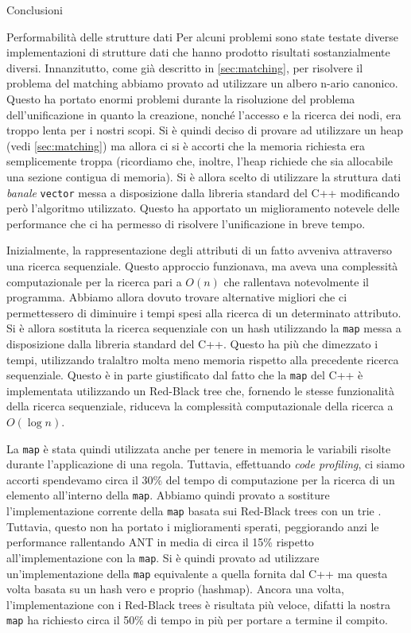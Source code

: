 \begin{chapter}{Conclusioni}

\begin{section}{Performabilit\`a delle strutture dati}
Per alcuni problemi sono state testate diverse implementazioni di strutture dati
che hanno prodotto risultati sostanzialmente diversi. Innanzitutto, come gi\`a
descritto in \ref{sec:matching}, per risolvere il problema del matching
abbiamo provato ad utilizzare un albero n-ario canonico. Questo ha portato
enormi problemi durante la risoluzione del problema dell'unificazione in quanto
la creazione, nonch\'e l'accesso e la ricerca dei nodi, era troppo lenta per
i nostri scopi. Si \`e quindi deciso di provare ad utilizzare un heap (vedi
\ref{sec:matching}) ma allora ci si \`e accorti che la memoria richiesta
era semplicemente troppa (ricordiamo che, inoltre, l'heap richiede che sia
allocabile una sezione contigua di memoria). Si \`e allora scelto di utilizzare
la struttura dati \textit{banale} \verb,vector, messa a disposizione dalla
libreria standard del C++ modificando per\`o l'algoritmo utilizzato. Questo ha
apportato un miglioramento notevele delle performance che ci ha permesso di
risolvere l'unificazione in breve tempo.

Inizialmente, la rappresentazione degli attributi di un fatto avveniva attraverso
una ricerca sequenziale. Questo approccio funzionava, ma aveva una complessit\`a
computazionale per la ricerca pari a $O(n)$ che rallentava notevolmente il programma.
Abbiamo allora dovuto trovare alternative migliori che ci permettessero di diminuire
i tempi spesi alla ricerca di un determinato attributo.
Si \`e allora sostituta la ricerca sequenziale con un hash utilizzando la \verb,map,
messa a disposizione dalla libreria standard del C++. Questo ha pi\`u che dimezzato i
tempi, utilizzando tralaltro molta meno memoria rispetto alla precedente ricerca
sequenziale. Questo \`e in parte giustificato dal fatto che la \verb,map, del C++ \`e
implementata utilizzando un Red-Black tree \cite{Skiena08} che, fornendo le stesse
funzionalit\`a della ricerca sequenziale, riduceva la complessit\`a computazionale
della ricerca a $O(\log n)$.

La \verb,map, \`e stata quindi utilizzata anche per tenere in memoria le variabili
risolte durante l'applicazione di una regola. Tuttavia, effettuando
\textit{code profiling}, ci siamo accorti spendevamo circa il 30\% del tempo di
computazione per la ricerca di un elemento all'interno della \verb,map,.
Abbiamo quindi provato a sostiture l'implementazione corrente della \verb,map,
basata sui Red-Black trees con un trie \cite{367400}. Tuttavia, questo non
ha portato i miglioramenti sperati, peggiorando anzi le performance rallentando
ANT in media di circa il 15\% rispetto all'implementazione con la \verb,map,.
Si \`e quindi provato ad utilizzare un'implementazione della \verb,map, equivalente
a quella fornita dal C++ ma questa volta basata su un hash vero e proprio (hashmap).
Ancora una volta, l'implementazione con i Red-Black trees \`e risultata pi\`u
veloce, difatti la nostra \verb,map, ha richiesto circa il 50\% di tempo in
pi\`u per portare a termine il compito.


\end{section}
\end{chapter}
